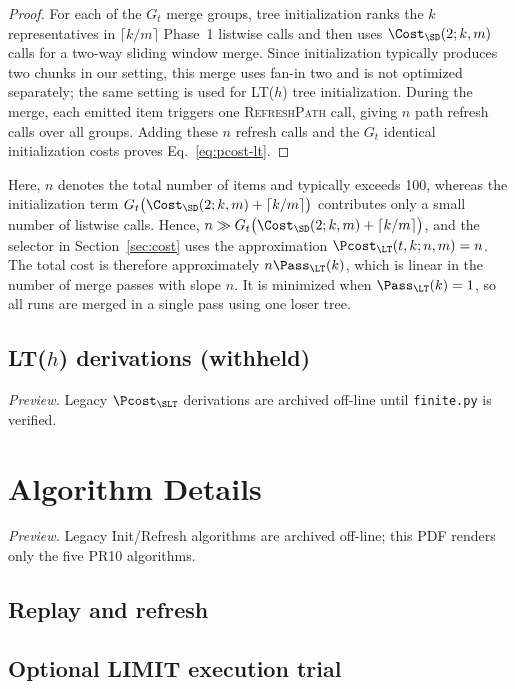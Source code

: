 \begin{proof}
For each of the $G_t$ merge groups, tree initialization ranks the $k$ representatives in $\lceil k/m\rceil$ Phase~1 listwise calls and then uses $\Cost_{\SD}(2;k,m)$ calls for a two-way sliding window merge. Since initialization typically produces two chunks in our setting, this merge uses fan-in two and is not optimized separately; the same setting is used for LT($h$) tree initialization. During the merge, each emitted item triggers one \textsc{RefreshPath} call, giving $n$ path refresh calls over all groups. Adding these $n$ refresh calls and the $G_t$ identical initialization costs proves Eq.~\eqref{eq:pcost-lt}.
\end{proof}

Here, $n$ denotes the total number of items and typically exceeds 100, whereas the initialization term $G_t\bigl(\Cost_{\SD}(2;k,m)+\lceil k/m\rceil\bigr)$ contributes only a small number of listwise calls. Hence, $n\gg G_t\bigl(\Cost_{\SD}(2;k,m)+\lceil k/m\rceil\bigr)$, and the selector in Section~\ref{sec:cost} uses the approximation $\Pcost_{\LT}(t,k;n,m)=n$. The total cost is therefore approximately $n\Pass_{\LT}(k)$, which is linear in the number of merge passes with slope $n$. It is minimized when $\Pass_{\LT}(k)=1$, so all runs are merged in a single pass using one loser tree.

\subsection{LT($h$) derivations (withheld)}
\noindent\textit{Preview.} Legacy $\Pcost_{\SLT}$ derivations are archived off-line until \texttt{finite.py} is verified.\par

\section{Algorithm Details}
\label{sec:appendix-algorithms}

\noindent\textit{Preview.} Legacy Init/Refresh algorithms are archived off-line; this PDF renders only the five PR10 algorithms.

\subsection{Replay and refresh}


\subsection{Optional LIMIT execution trial}


